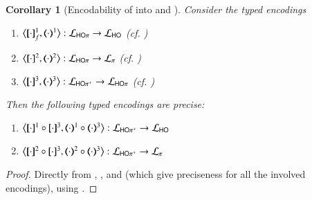 \documentclass[preprint,11pt]{elsarticle}
\newtheorem{corollary}{Corollary}[section]
\begin{document}
{\begin{corollary}[Encodability of \HOpp into \HOp and \sessp]
\label{coro:ho} 
Consider the typed encodings
\begin{enumerate}[-]
\item $\enco{\map{\cdot}^{1}_f, \mapt{\cdot}^{1} %
}: \tyl{L}_{\HOp} \to \tyl{L}_{\HO}$  (cf. )
\item $\enco{\map{\cdot}^{2}, \mapt{\cdot}^{2} %
}: \tyl{L}_{\HOp} \to \tyl{L}_{\sessp}$ (cf. )
\item $\enco{\map{\cdot}^{3}, \mapt{\cdot}^{3}}: \tyl{L}_{\HOpp} \to \tyl{L}_{\HOp}$ (cf. )
\end{enumerate}
Then the following typed encodings 	are precise:
\begin{enumerate}[-]
\item 
$\enco{\pmap{\cdot}{1} \circ \pmap{\cdot}{3}, \tmap{\cdot}{1} \circ \tmap{\cdot}{3}}: \tyl{L}_\HOpp \to \tyl{L}_\HO$
\item
$\enco{\pmap{\cdot}{2} \circ \pmap{\cdot}{3}, \tmap{\cdot}{2} \circ \tmap{\cdot}{3}}: \tyl{L}_\HOpp \to \tyl{L}_\sessp$
\end{enumerate}

\end{corollary}

\begin{proof}
Directly from 
, 
, 
and 
 (which give preciseness for all the involved encodings), using
.
\end{proof}




}
\end{document}
